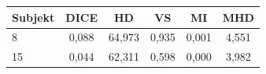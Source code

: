 \begin{tabular}{l c c c c c}
 \hline
Subjekt & DICE & HD & VS & MI & MHD \\ \hline
8 & 0,088 & 64,973 & 0,935 & 0,001 & 4,551 \\
15 & 0,044 & 62,311 & 0,598 & 0,000 & 3,982 \\
\hline 
 \end{tabular}
